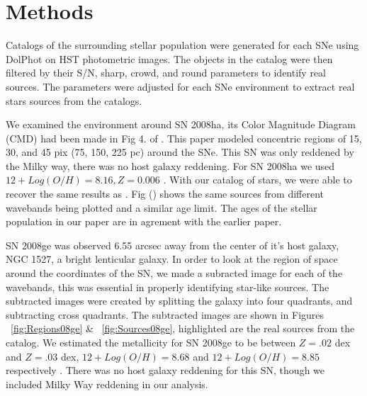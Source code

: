 \documentclass[preprint]{aastex}
\begin{document}
\section{Methods}
Catalogs of the surrounding stellar population 
were generated for each SNe using DolPhot on HST photometric images. 
The objects in the catalog were then filtered by their 
S/N, sharp, crowd, and round parameters to identify real sources.
The parameters were adjusted for each SNe environment to extract real stars sources from the catalogs.

We examined the environment around SN 2008ha, its 
Color Magnitude Diagram (CMD) had been made in Fig 4. of \citet{fol1409}.
This paper modeled concentric regions of 15, 30, and 45 pix (75, 150, 225 pc)
around the SNe. 
This SN was only reddened by the Milky way, there was no host galaxy reddening.
For SN 2008ha we used $ 12 + Log(O/H) = 8.16, Z = 0.006$ \citep{fol09,tak95}.
With our catalog of stars, we were able to recover the same
results as \citet{fol1409}.
Fig () shows the same sources from different wavebands being plotted
and a similar age limit. 
The ages of the stellar population in our paper are in agrement with the earlier paper. 

SN 2008ge was observed 6.55 arcsec away from the center of it's host galaxy,
NGC 1527, a bright lenticular galaxy. 
In order to look at the region of space around the coordinates of the SN, 
we made a subracted image for each of the wavebands, this was essential in
properly identifying star-like sources. 
The subtracted images
were created by splitting the galaxy into four quadrants, and subtracting 
cross quadrants. 
The subtracted images are shown in Figures ~\ref{fig:Regions08ge} \& ~\ref{fig:Sources08ge}, 
highlighted are the real sources from the catalog. 
We estimated the metallicity for SN 2008ge to be between 
$Z = .02$ dex and $Z = .03$ dex, $12 + Log(O/H) = 8.68$  and $12 + Log(O/H) = 8.85$ respectively \citep{pro11}. 
There was no host galaxy reddening for this SN, though we included Milky Way reddening in our analysis. 
\end{document}
